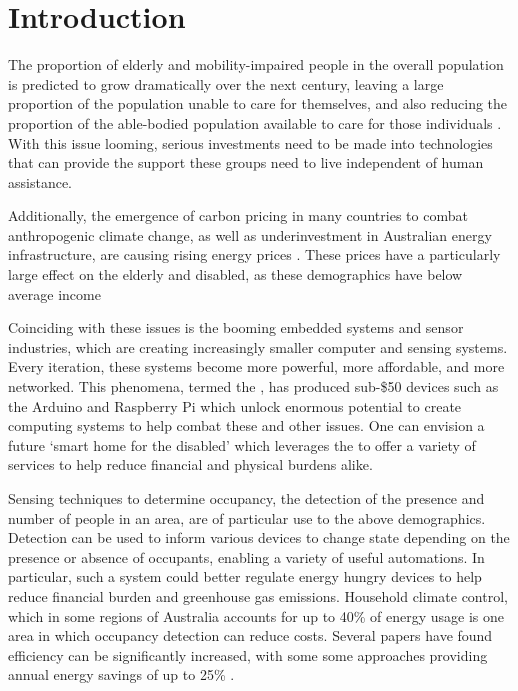 \documentclass[../thesis/thesis.tex]{subfiles}
\begin{document}
\chapter{Introduction}
 
The proportion of elderly and mobility-impaired people in the overall population is predicted to grow dramatically over the next century, leaving a large proportion of the population unable to care for themselves, and also reducing the proportion of the able-bodied population available to care for those individuals \cite{chan2009smart}. With this issue looming, serious investments need to be made into technologies that can provide the support these groups need to live independent of human assistance. 

Additionally, the emergence of carbon pricing in many countries to combat anthropogenic climate change, as well as underinvestment in Australian energy infrastructure, are causing rising energy prices \cite{energyprices}. These prices have a particularly large effect on the elderly and disabled, as these demographics have below average income

Coinciding with these issues is the booming embedded systems and sensor industries, which are creating increasingly smaller computer and sensing systems. Every iteration, these systems become more powerful, more affordable, and more networked. This phenomena, termed the \iot, has produced sub-\$50 devices such as the Arduino and Raspberry Pi which unlock enormous potential to create computing systems to help combat these and other issues. One can envision a future `smart home for the disabled' which leverages the \iot to offer a variety of services to help reduce financial and physical burdens alike.

Sensing techniques to determine occupancy, the detection of the presence and number of people in an area, are of particular use to the above demographics. Detection can be used to inform various devices to change state depending on the presence or absence of occupants, enabling a variety of useful automations. In particular, such a system could better regulate energy hungry devices to help reduce financial burden and greenhouse gas emissions. Household climate control, which in some regions of Australia accounts for up to 40\% of energy usage \cite{abs4602} is one area in which occupancy detection can reduce costs. Several papers have found efficiency can be significantly increased, with some some approaches providing annual energy savings of up to 25\% \cite{beltran2013thermosense}.
 
\end{document}
